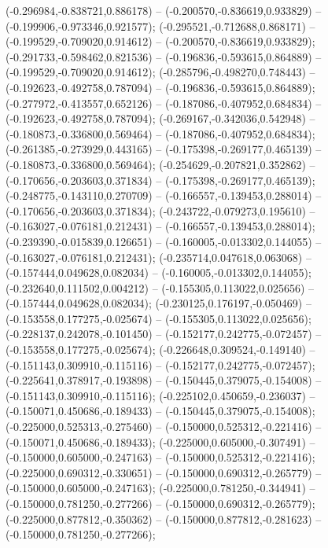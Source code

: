  (-0.296984,-0.838721,0.886178) -- (-0.200570,-0.836619,0.933829) -- (-0.199906,-0.973346,0.921577);
 (-0.295521,-0.712688,0.868171) -- (-0.199529,-0.709020,0.914612) -- (-0.200570,-0.836619,0.933829);
 (-0.291733,-0.598462,0.821536) -- (-0.196836,-0.593615,0.864889) -- (-0.199529,-0.709020,0.914612);
 (-0.285796,-0.498270,0.748443) -- (-0.192623,-0.492758,0.787094) -- (-0.196836,-0.593615,0.864889);
 (-0.277972,-0.413557,0.652126) -- (-0.187086,-0.407952,0.684834) -- (-0.192623,-0.492758,0.787094);
 (-0.269167,-0.342036,0.542948) -- (-0.180873,-0.336800,0.569464) -- (-0.187086,-0.407952,0.684834);
 (-0.261385,-0.273929,0.443165) -- (-0.175398,-0.269177,0.465139) -- (-0.180873,-0.336800,0.569464);
 (-0.254629,-0.207821,0.352862) -- (-0.170656,-0.203603,0.371834) -- (-0.175398,-0.269177,0.465139);
 (-0.248775,-0.143110,0.270709) -- (-0.166557,-0.139453,0.288014) -- (-0.170656,-0.203603,0.371834);
 (-0.243722,-0.079273,0.195610) -- (-0.163027,-0.076181,0.212431) -- (-0.166557,-0.139453,0.288014);
 (-0.239390,-0.015839,0.126651) -- (-0.160005,-0.013302,0.144055) -- (-0.163027,-0.076181,0.212431);
 (-0.235714,0.047618,0.063068) -- (-0.157444,0.049628,0.082034) -- (-0.160005,-0.013302,0.144055);
 (-0.232640,0.111502,0.004212) -- (-0.155305,0.113022,0.025656) -- (-0.157444,0.049628,0.082034);
 (-0.230125,0.176197,-0.050469) -- (-0.153558,0.177275,-0.025674) -- (-0.155305,0.113022,0.025656);
 (-0.228137,0.242078,-0.101450) -- (-0.152177,0.242775,-0.072457) -- (-0.153558,0.177275,-0.025674);
 (-0.226648,0.309524,-0.149140) -- (-0.151143,0.309910,-0.115116) -- (-0.152177,0.242775,-0.072457);
 (-0.225641,0.378917,-0.193898) -- (-0.150445,0.379075,-0.154008) -- (-0.151143,0.309910,-0.115116);
 (-0.225102,0.450659,-0.236037) -- (-0.150071,0.450686,-0.189433) -- (-0.150445,0.379075,-0.154008);
 (-0.225000,0.525313,-0.275460) -- (-0.150000,0.525312,-0.221416) -- (-0.150071,0.450686,-0.189433);
 (-0.225000,0.605000,-0.307491) -- (-0.150000,0.605000,-0.247163) -- (-0.150000,0.525312,-0.221416);
 (-0.225000,0.690312,-0.330651) -- (-0.150000,0.690312,-0.265779) -- (-0.150000,0.605000,-0.247163);
 (-0.225000,0.781250,-0.344941) -- (-0.150000,0.781250,-0.277266) -- (-0.150000,0.690312,-0.265779);
 (-0.225000,0.877812,-0.350362) -- (-0.150000,0.877812,-0.281623) -- (-0.150000,0.781250,-0.277266);
